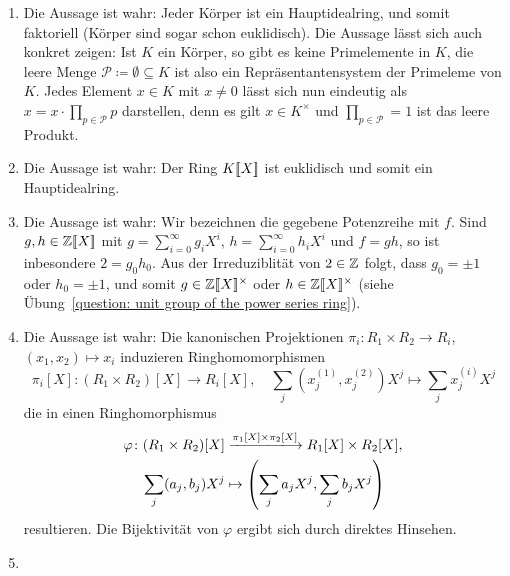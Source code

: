 \begin{solution}
  \begin{enumerate}
    \item
      Die Aussage ist wahr:
      Jeder Körper ist ein Hauptidealring, und somit faktoriell (Körper sind sogar schon euklidisch).
      Die Aussage lässt sich auch konkret zeigen:
      Ist $K$ ein Körper, so gibt es keine Primelemente in $K$, die leere Menge $\mathcal{P} \coloneqq \emptyset \subseteq K$ ist also ein Repräsentantensystem der Primeleme von $K$.
      Jedes Element $x \in K$ mit $x \neq 0$ lässt sich nun eindeutig als $x = x \cdot \prod_{p \in \mathcal{P}} p$ darstellen, denn es gilt $x \in K^\times$ und $\prod_{p \in \mathcal{P}} = 1$ ist das leere Produkt.
    \item
      Die Aussage ist wahr:
      Der Ring $K[\![X]\!]$ ist euklidisch und somit ein Hauptidealring.
    \item
      Die Aussage ist wahr:
      Wir bezeichnen die gegebene Potenzreihe mit $f$.
      Sind $g, h \in \mathbb{Z}[\![X]\!]$ mit $g = \sum_{i=0}^\infty g_i X^i$, $h = \sum_{i=0}^\infty h_i X^i$ und $f = gh$, so ist inbesondere $2 = g_0 h_0$.
      Aus der Irreduziblität von $2 \in \mathbb{Z}$ folgt, dass $g_0 = \pm 1$ oder $h_0 = \pm 1$, und somit $g \in \mathbb{Z}[\![X]\!]^\times$ oder $h \in \mathbb{Z}[\![X]\!]^\times$ (siehe Übung~\ref{question: unit group of the power series ring}).
    \item
      Die Aussage ist wahr:
      Die kanonischen Projektionen $\pi_i \colon R_1 \times R_2 \to R_i$, $(x_1, x_2) \mapsto x_i$ induzieren Ringhomomorphismen
      \[
                \pi_i[X]
        \colon  (R_1 \times R_2)[X] \to R_i[X],
        \quad
                \sum_j \left( x^{(1)}_j, x^{(2)}_j \right) X^j
        \mapsto \sum_j x^{(i)}_j X^j
      \]
      die in einen Ringhomorphismus
      \begin{align*}
                                                    \varphi
         \colon                                     (R_1 \times R_2)[X]
        &\xlongrightarrow{\pi_1[X] \times \pi_2[X]} R_1[X] \times R_2[X],
        \\
                                                    \sum_j (a_j, b_j) X^j
        &\mapsto                                    \left( \sum_j a_j X^j, \sum_j b_j X^j \right)
      \end{align*}
      resultieren.
      Die Bijektivität von $\varphi$ ergibt sich durch direktes Hinsehen.
    \item

\end{enumerate}
\end{solution}
